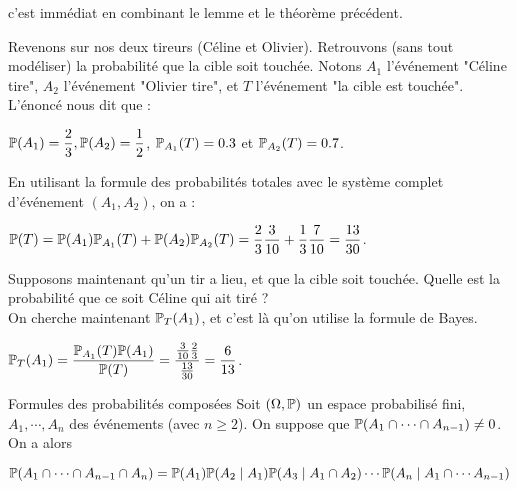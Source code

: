\documentclass[12pt,a4paper]{report}
\begin{document}
\begin{demo}{}
c'est immédiat en combinant le lemme et le théorème précédent.
\end{demo}

\begin{exemple}{}
Revenons sur nos deux tireurs (Céline et Olivier)\footnotemark. Retrouvons (sans tout modéliser) la probabilité que la cible soit touchée. Notons $A_1$ l'événement "Céline tire", $A_2$ l'événement "Olivier tire"\footnotemark, et $T$ l'événement "la cible est touchée". L'énoncé nous dit que :
\begin{center}
$\mathbb{P}(A_1) = \dfrac{2}{3}, \mathbb{P}(A_2) = \dfrac{1}{2}$, $\mathbb{P}_{A_1}(T) = 0.3$ et $\mathbb{P}_{A_2}(T) = 0.7$.
\end{center}



En utilisant la formule des probabilités totales avec le système complet d'événement $(A_1,A_2)$, on a :
\begin{center}
$\mathbb{P}(T) = \mathbb{P}(A_1)\mathbb{P}_{A_1}(T) + \mathbb{P}(A_2) \mathbb{P}_{A_2}(T) = \dfrac{2}{3} \dfrac{3}{10} + \dfrac{1}{3} \dfrac{7}{10} = \dfrac{13}{30}$.
\end{center}

Supposons maintenant qu'un tir a lieu, et que la cible soit touchée. Quelle est la probabilité que ce soit Céline qui ait tiré ? \\
On cherche maintenant $\mathbb{P}_T(A_1)$, et c'est là qu'on utilise la formule de Bayes.
\begin{center}
$\mathbb{P}_T(A_1) = \dfrac{\mathbb{P}_{A_1}(T)\mathbb{P}(A_1)}{\mathbb{P}(T)} = \dfrac{\frac{3}{10}\frac{2}{3}}{\frac{13}{30}} = \dfrac{6}{13}$.
\end{center}
\end{exemple}

\pagebreak

\begin{theoreme}{Formules des probabilités composées}{}
Soit $(\Omega,\mathbb{P})$ un espace probabilisé fini, $A_1, \cdots, A_n$ des événements (avec $n \ge 2$). On suppose que $\mathbb{P}(A_1 \cap \cdots \cap A_{n-1})\ne 0$. On a alors
\begin{center}
$\mathbb{P}(A_1 \cap \cdots \cap A_{n-1} \cap A_n) = \mathbb{P}(A_1)\mathbb{P}(A_2 \mid A_1)\mathbb{P}(A_3 \mid A_1 \cap A_2)\cdots \mathbb{P}(A_n \mid A_1 \cap \cdots A_{n-1})$
\end{center}
\end{theoreme}
\end{document}
